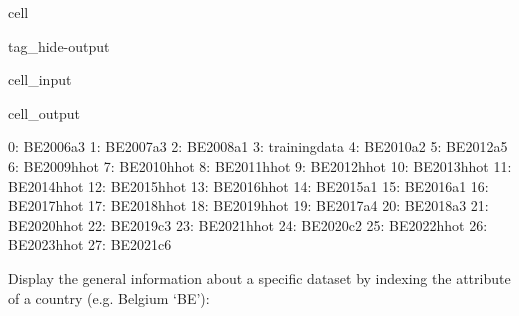 \documentclass[letterpaper,10pt,english]{sphinxmanual}
\begin{document}
\begin{sphinxuseclass}{cell}
\begin{sphinxuseclass}{tag_hide-output}
\begin{sphinxuseclass}{cell_input}
\begin{sphinxVerbatim}[commandchars=\\\{\}]
\PYG{p}{[}\PYG{p}{]}
\end{sphinxVerbatim}

\end{sphinxuseclass}
\begin{sphinxuseclass}{cell_output}
\begin{sphinxVerbatim}[commandchars=\\\{\}]
0: BE\PYGZus{}2006\PYGZus{}a3   
1: BE\PYGZus{}2007\PYGZus{}a3   
2: BE\PYGZus{}2008\PYGZus{}a1   
3: training\PYGZus{}data
4: BE\PYGZus{}2010\PYGZus{}a2   
5: BE\PYGZus{}2012\PYGZus{}a5   
6: BE\PYGZus{}2009\PYGZus{}hhot 
7: BE\PYGZus{}2010\PYGZus{}hhot 
8: BE\PYGZus{}2011\PYGZus{}hhot 
9: BE\PYGZus{}2012\PYGZus{}hhot 
10: BE\PYGZus{}2013\PYGZus{}hhot
11: BE\PYGZus{}2014\PYGZus{}hhot
12: BE\PYGZus{}2015\PYGZus{}hhot
13: BE\PYGZus{}2016\PYGZus{}hhot
14: BE\PYGZus{}2015\PYGZus{}a1  
15: BE\PYGZus{}2016\PYGZus{}a1  
16: BE\PYGZus{}2017\PYGZus{}hhot
17: BE\PYGZus{}2018\PYGZus{}hhot
18: BE\PYGZus{}2019\PYGZus{}hhot
19: BE\PYGZus{}2017\PYGZus{}a4  
20: BE\PYGZus{}2018\PYGZus{}a3  
21: BE\PYGZus{}2020\PYGZus{}hhot
22: BE\PYGZus{}2019\PYGZus{}c3  
23: BE\PYGZus{}2021\PYGZus{}hhot
24: BE\PYGZus{}2020\PYGZus{}c2  
25: BE\PYGZus{}2022\PYGZus{}hhot
26: BE\PYGZus{}2023\PYGZus{}hhot
27: BE\PYGZus{}2021\PYGZus{}c6  
\end{sphinxVerbatim}

\end{sphinxuseclass}
\end{sphinxuseclass}
\end{sphinxuseclass}
\sphinxAtStartPar
Display the general information about a specific dataset by indexing the  attribute of a country (e.g. Belgium ‘BE’):
\end{document}
